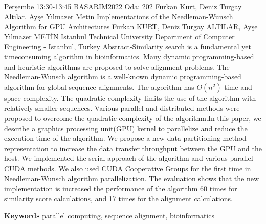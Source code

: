 
    \begin{abstract_basarim}
    {Perşembe 13:30-13:45}
    {BASARIM2022}
    {Oda: 202}
    {Furkan Kurt, Deniz Turgay Altılar, Ayşe Yılmazer Metin}
    {Implementations of the Needleman-Wunsch Algorithm for GPU Architectures}
    {%
    Furkan KURT, Deniz Turgay ALTILAR, Ayşe Yılmazer METİN}
    {%
    }
    {%
    Istanbul Technical University Department of Computer Engineering - Istanbul, Turkey}
    Abstract-Similarity search is a fundamental yet timeconsuming algorithm in bioinformatics. Many dynamic programming-based and heuristic algorithms are proposed to solve alignment problems. The Needleman-Wunsch algorithm is a well-known dynamic programming-based algorithm for global sequence alignments. The algorithm has $O\left(n^{2}\right)$ time and space complexity. The quadratic complexity limits the use of the algorithm with relatively smaller sequences. Various parallel and distributed methods were proposed to overcome the quadratic complexity of the algorithm.\newline In this paper, we describe a graphics processing unit(GPU) kernel to parallelize and reduce the execution time of the algorithm. We propose a new data partitioning method representation to increase the data transfer throughput between the GPU and the host. We implemented the serial approach of the algorithm and various parallel CUDA methods. We also used CUDA Cooperative Groups for the first time in Needleman-Wunsch algorithm parallelization. The evaluation shows that the new implementation is increased the performance of the algorithm 60 times for similarity score calculations, and 17 times for the alignment calculations. 
    
        \textbf{Keywords} \newline{}parallel computing, sequence alignment, bioinformatics
    \end{abstract_basarim}
    